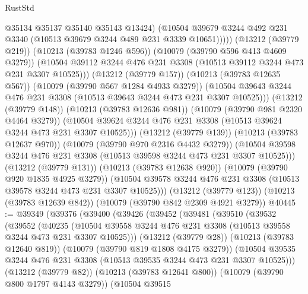 \begin{lexlean}{RustStd}
\begin{coremodule}
                      @35134
                      @35137
                      @35140
                      @35143
                      @13424)
                    (@10504
                      @39679
                      @3244
                      @492
                      @231
                      @3340
                      (@10513 @39679 @3244 @489 @231 @3339 @10651)))))
              (@13212 (@39779 @219))
              (@10213 (@39783 @1246 @596))
              (@10079 (@39790 @596 @413 @4609 @3279))
              (@10504 @39112 @3244 @476 @231 @3308 (@10513 @39112 @3244 @473 @231 @3307 @10525)))
            (@13212 (@39779 @157))
            (@10213 (@39783 @12635 @567))
            (@10079 (@39790 @567 @1284 @4933 @3279))
            (@10504 @39643 @3244 @476 @231 @3308 (@10513 @39643 @3244 @473 @231 @3307 @10525)))
          (@13212 (@39779 @148))
          (@10213 (@39783 @12636 @981))
          (@10079 (@39790 @981 @2320 @4464 @3279))
          (@10504 @39624 @3244 @476 @231 @3308 (@10513 @39624 @3244 @473 @231 @3307 @10525)))
        (@13212 (@39779 @139))
        (@10213 (@39783 @12637 @970))
        (@10079 (@39790 @970 @2316 @4432 @3279))
        (@10504 @39598 @3244 @476 @231 @3308 (@10513 @39598 @3244 @473 @231 @3307 @10525)))
      (@13212 (@39779 @131))
      (@10213 (@39783 @12638 @920))
      (@10079 (@39790 @920 @1835 @4925 @3279))
      (@10504 @39578 @3244 @476 @231 @3308 (@10513 @39578 @3244 @473 @231 @3307 @10525)))
    (@13212 (@39779 @123))
    (@10213 (@39783 @12639 @842))
    (@10079 (@39790 @842 @2309 @4921 @3279))
@40445 := @39349
    (@39376
      (@39400
        (@39426
          (@39452
            (@39481
              (@39510
                (@39532
                  (@39552
                    (@40235
                      (@10504
                        @39558
                        @3244
                        @476
                        @231
                        @3308
                        (@10513 @39558 @3244 @473 @231 @3307 @10525)))
                    (@13212 (@39779 @28))
                    (@10213 (@39783 @12640 @819))
                    (@10079 (@39790 @819 @1808 @4175 @3279))
                    (@10504
                      @39535
                      @3244
                      @476
                      @231
                      @3308
                      (@10513 @39535 @3244 @473 @231 @3307 @10525)))
                  (@13212 (@39779 @82))
                  (@10213 (@39783 @12641 @800))
                  (@10079 (@39790 @800 @1797 @4143 @3279))
                  (@10504
                    @39515

\end{coremodule}
\end{lexlean}
